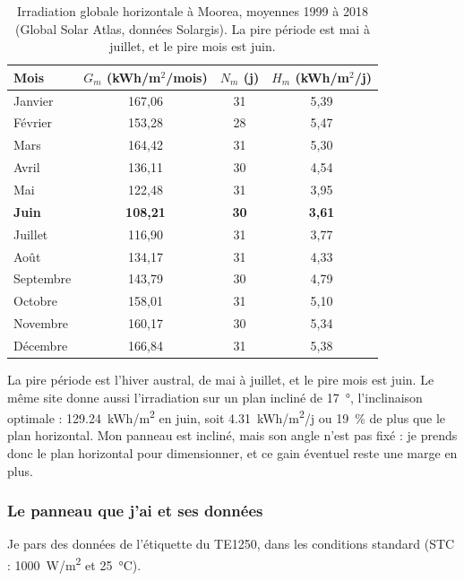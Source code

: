 \begin{table}[H]
\centering
\small
\begin{tabular}{|l|c|c|c|}
\hline
\textbf{Mois} & \textbf{$G_m$ (kWh/m$^2$/mois)} & \textbf{$N_m$ (j)} & \textbf{$H_m$ (kWh/m$^2$/j)} \\
\hline
Janvier & 167,06 & 31 & 5,39 \\
\hline
Février & 153,28 & 28 & 5,47 \\
\hline
Mars & 164,42 & 31 & 5,30 \\
\hline
Avril & 136,11 & 30 & 4,54 \\
\hline
Mai & 122,48 & 31 & 3,95 \\
\hline
\textbf{Juin} & \textbf{108,21} & \textbf{30} & \textbf{3,61} \\
\hline
Juillet & 116,90 & 31 & 3,77 \\
\hline
Août & 134,17 & 31 & 4,33 \\
\hline
Septembre & 143,79 & 30 & 4,79 \\
\hline
Octobre & 158,01 & 31 & 5,10 \\
\hline
Novembre & 160,17 & 30 & 5,34 \\
\hline
Décembre & 166,84 & 31 & 5,38 \\
\hline
\end{tabular}
\caption{Irradiation globale horizontale à Moorea, moyennes 1999 à 2018 (Global Solar Atlas, données Solargis). La pire période est mai à juillet, et le pire mois est juin.}
\end{table}

La pire période est l'hiver austral, de mai à juillet, et le pire mois est juin. Le même site donne aussi l'irradiation sur un plan incliné de \qty{17}{\degree}, l'inclinaison optimale : \qty{129,24}{kWh/m^2} en juin, soit \qty{4,31}{kWh/m^2/j} ou \qty{19}{\percent} de plus que le plan horizontal. Mon panneau est incliné, mais son angle n'est pas fixé : je prends donc le plan horizontal pour dimensionner, et ce gain éventuel reste une marge en plus.

\subsubsection*{Le panneau que j'ai et ses données}

Je pars des données de l'étiquette du TE1250, dans les conditions standard (STC : \qty{1000}{W/m^2} et \qty{25}{\celsius}).


